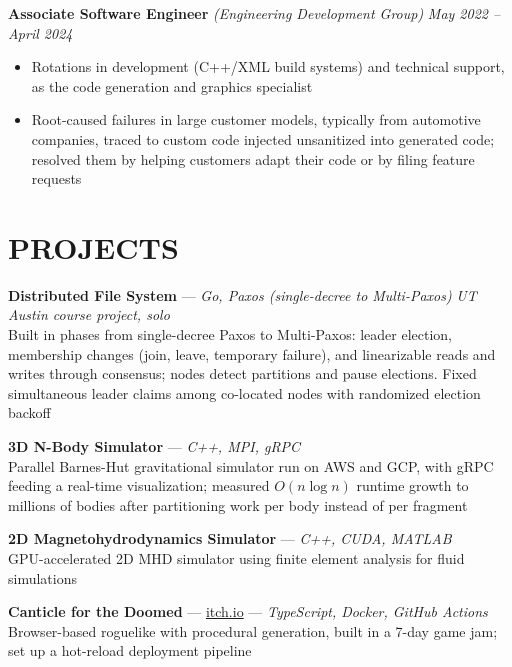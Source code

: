 \documentclass{article}
\begin{document}
{\large \textbf{Associate Software Engineer}} \textit{(Engineering Development Group)} \hfill \textit{May 2022 -- April 2024}
\begin{itemize}[leftmargin=*]
    \item Rotations in development (C++/XML build systems) and technical support, as the code generation and graphics specialist %
    \item Root-caused failures in large customer models, typically from automotive companies, traced to custom code injected unsanitized into generated code; resolved them by helping customers adapt their code or by filing feature requests %
\end{itemize}

\section*{PROJECTS}
\textbf{Distributed File System} — \textit{Go, Paxos (single-decree to Multi-Paxos)} \hfill \textit{UT Austin course project, solo} \\
Built in phases from single-decree Paxos to Multi-Paxos: leader election, membership changes (join, leave, temporary failure), and linearizable reads and writes through consensus; nodes detect partitions and pause elections. Fixed simultaneous leader claims among co-located nodes with randomized election backoff %

\textbf{3D N-Body Simulator} — \textit{C++, MPI, gRPC} \\
Parallel Barnes-Hut gravitational simulator run on AWS and GCP, with gRPC feeding a real-time visualization; measured $O(n \log n)$ runtime growth to millions of bodies after partitioning work per body instead of per fragment %

\textbf{2D Magnetohydrodynamics Simulator} — \textit{C++, CUDA, MATLAB} \\
GPU-accelerated 2D MHD simulator using finite element analysis for fluid simulations %

\textbf{Canticle for the Doomed} — \href{https://sve009.itch.io/canticle-for-the-doomed}{itch.io} — \textit{TypeScript, Docker, GitHub Actions} \\
Browser-based roguelike with procedural generation, built in a 7-day game jam; set up a hot-reload deployment pipeline %

\end{document}
